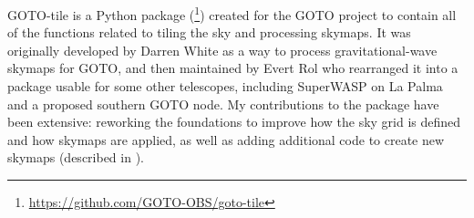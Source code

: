 \begin{colsection}

GOTO-tile is a Python package (\footnote{\url{https://github.com/GOTO-OBS/goto-tile}}) created for the GOTO project to contain all of the functions related to tiling the sky and processing skymaps. It was originally developed by Darren White as a way to process gravitational-wave skymaps for GOTO, and then maintained by Evert Rol who rearranged it into a package usable for some other telescopes, including SuperWASP on La Palma and a proposed southern GOTO node. My contributions to the package have been extensive: reworking the foundations to improve how the sky grid is defined and how skymaps are applied, as well as adding additional code to create new skymaps (described in ).

\end{colsection}


